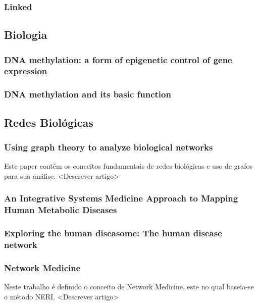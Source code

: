 	\subsubsection{Linked}
	\cite{linked-barabasi}
	
\subsection{Biologia}

	\subsubsection{DNA methylation: a form of epigenetic control of gene expression}
	\cite{Lim-Derek}
	
	\subsubsection{DNA methylation and its basic function}
	\cite{Moore-lisa}
	
\subsection{Redes Biológicas}
	\subsubsection{Using graph theory to analyze biological networks}
	\cite{Pavlopoulos}
	Este paper contém os conceitos fundamentais de redes biológicas e uso de grafos para sua análise.
<Descrever artigo>


	\subsubsection{An Integrative Systems Medicine Approach to Mapping Human Metabolic Diseases}
	\cite{barabasi-lazlo}
	
	\subsubsection{Exploring the human diseasome: The human disease network }
	\cite{goh-kwang}
	
	\subsubsection{Network Medicine}
	\cite{barabasi}
	
	Neste trabalho é definido o conceito de Network Medicine, este no qual baseia-se o método NERI.
<Descrever artigo>


